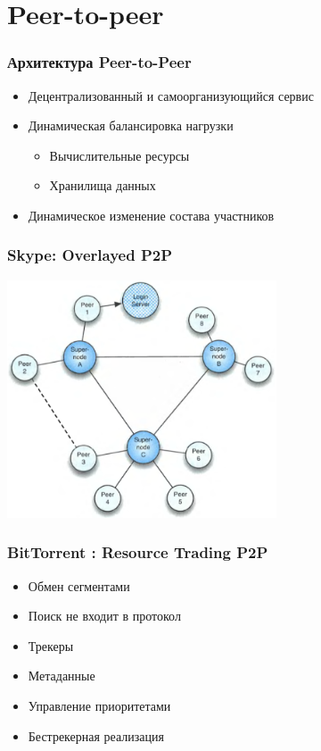 \documentclass[xetex,mathserif,serif]{beamer}
\begin{document}
    \section{Peer-to-peer}

    \begin{frame}
        \frametitle{Архитектура Peer-to-Peer}
        \begin{itemize}
            \item Децентрализованный и самоорганизующийся сервис
            \item Динамическая балансировка нагрузки
            \begin{itemize}
                \item Вычислительные ресурсы
                \item Хранилища данных
            \end{itemize}
            \item Динамическое изменение состава участников
        \end{itemize}
    \end{frame}

    \begin{frame}
        \frametitle{Skype: Overlayed P2P}
        \begin{center}
            \includegraphics[width=0.6\textwidth]{skype.png}
        \end{center}
    \end{frame}

    \begin{frame}
        \frametitle{BitTorrent : Resource Trading P2P}
        \begin{itemize}
            \item Обмен сегментами
            \item Поиск не входит в протокол
            \item Трекеры
            \item Метаданные
            \item Управление приоритетами
            \item Бестрекерная реализация
        \end{itemize}
    \end{frame}
\end{document}

